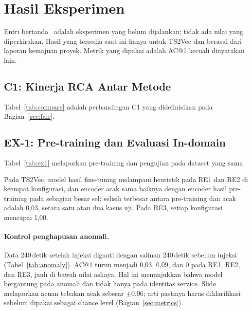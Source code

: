 \section{Hasil Eksperimen}\label{sec:results}
Entri bertanda \pending\ adalah eksperimen yang belum dijalankan; tidak ada nilai yang diperkirakan. Hasil yang tersedia saat ini hanya untuk TS2Vec dan berasal dari laporan kemajuan proyek. Metrik yang dipakai adalah AC@1 kecuali dinyatakan lain.

\subsection{C1: Kinerja RCA Antar Metode}
Tabel~\ref{tab:compare} adalah perbandingan C1 yang didefinisikan pada Bagian~\ref{sec:fair}.


\subsection{EX-1: Pre-training dan Evaluasi In-domain}
Tabel~\ref{tab:ex1} melaporkan pre-training dan pengujian pada dataset yang sama.

Pada TS2Vec, model hasil fine-tuning melampaui heuristik pada RE1 dan RE2 di keempat konfigurasi, dan encoder acak sama baiknya dengan encoder hasil pre-training pada sebagian besar sel; selisih terbesar antara pre-training dan acak adalah 0,03, setara satu atau dua kasus uji. Pada RE3, setiap konfigurasi mencapai 1,00. 

\paragraph{Kontrol penghapusan anomali.} Data 240\,detik setelah injeksi diganti dengan salinan 240\,detik sebelum injeksi (Tabel~\ref{tab:anomaly}). AC@1 turun menjadi 0,03, 0,09, dan 0 pada RE1, RE2, dan RE3, jauh di bawah nilai aslinya. Hal ini menunjukkan bahwa model bergantung pada anomali dan tidak hanya pada identitas service. Slide melaporkan acuan tebakan acak sebesar $\pm$0,06; arti pastinya harus diklarifikasi sebelum dipakai sebagai chance level (Bagian~\ref{sec:metrics}).


